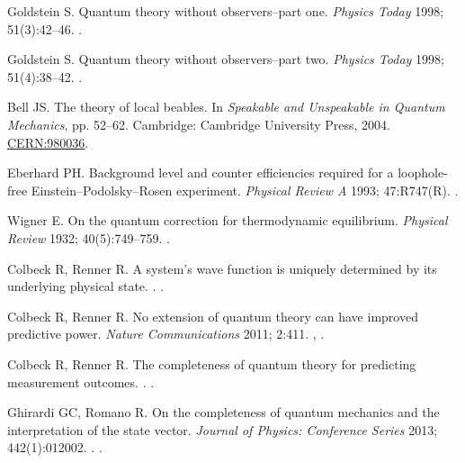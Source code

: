 \documentclass[DIV=calc,fontsize=12pt]{scrartcl} %
\theoremstyle{definition}
\theoremstyle{plain}
\begin{document}
\begin{thebibliography}{10}
Goldstein S.
\newblock Quantum theory without observers--part one.
\newblock \emph{Physics Today} 1998; 51(3):42--46.
\newblock \href {http://dx.doi.org/10.1063/1.882184}
{}.

Goldstein S.
\newblock Quantum theory without observers--part two.
\newblock \emph{Physics Today} 1998; 51(4):38--42.
\newblock \href {http://dx.doi.org/10.1063/1.882241}
{}.

Bell JS.
\newblock The theory of local beables.
\newblock In \emph{Speakable and Unspeakable in Quantum Mechanics}, pp.
52--62. Cambridge: Cambridge University Press, 2004.
\newblock \href{https://cds.cern.ch/record/980036}{CERN:980036}.

Eberhard PH.
\newblock Background level and counter efficiencies required for a loophole-free Einstein--Podolsky--Rosen experiment.
\newblock \emph{Physical Review A} 1993; 47:R747(R).
\newblock \href {http://dx.doi.org/10.1103/PhysRevA.47.R747}
{}.

Wigner E.
\newblock On the quantum correction for thermodynamic equilibrium.
\newblock \emph{Physical Review} 1932; 40(5):749--759.
\newblock \href {http://dx.doi.org/10.1103/PhysRev.40.749}
{}.

Colbeck R, Renner R.
\newblock A system's wave function is uniquely determined by its underlying physical state.
.
\newblock \href {http://arxiv.org/abs/1312.7353} {}.

Colbeck R, Renner R.
\newblock No extension of quantum theory can have improved predictive power.
\newblock \emph{Nature Communications} 2011; 2:411.
\newblock \href {http://arxiv.org/abs/1005.5173} {},
\href {http://dx.doi.org/10.1038/ncomms1416} {}.

Colbeck R, Renner R.
\newblock The completeness of quantum theory for predicting measurement outcomes.
.
\newblock \href {http://arxiv.org/abs/1208.4123} {}.

Ghirardi GC, Romano R.
\newblock On the completeness of quantum mechanics and the interpretation of
the state vector.
\newblock \emph{Journal of Physics: Conference Series} 2013; 442(1):012002.
.
\newblock \href {http://dx.doi.org/10.1088/1742-6596/442/1/012002}
{}.


\end{thebibliography}
\end{document}
